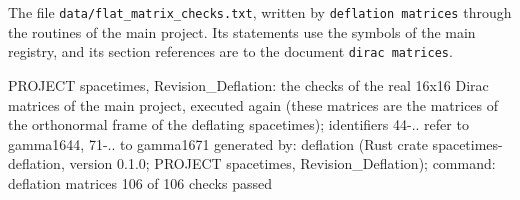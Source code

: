 \documentclass[
  10pt,
]{article}
\newenvironment{Shaded}{}{}
\newcommand{\NormalTok}[1]{#1}
\begin{document}
The file \texttt{data/flat\_matrix\_checks.txt}, written by
\texttt{deflation\ matrices} through the routines of the main project.
Its statements use the symbols of the main registry, and its section
references are to the document \texttt{dirac\ matrices}.

\begin{Shaded}
\begin{Highlighting}[]
\NormalTok{PROJECT spacetimes, Revision\_Deflation: the checks of the real 16x16 Dirac matrices of the main project, executed again (these matrices are the matrices of the orthonormal frame of the deflating spacetimes); identifiers 44{-}.. refer to gamma1644, 71{-}.. to gamma1671}
\NormalTok{generated by: deflation (Rust crate spacetimes{-}deflation, version 0.1.0; PROJECT spacetimes, Revision\_Deflation); command: deflation matrices}
\NormalTok{106 of 106 checks passed}


\end{Highlighting}
\end{Shaded}
\end{document}

